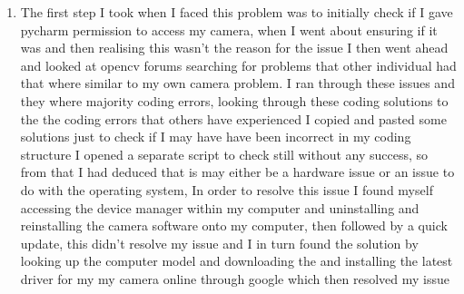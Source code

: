 \begin{enumerate}
 \item  The first step I took when I faced this problem was to initially check if I gave pycharm permission to access my camera, when I went about ensuring if it was and then realising this wasn't the reason for the issue I then went ahead and looked at opencv forums searching for problems that other individual had that where similar to my own camera problem. I ran through these issues and they where majority coding errors, looking through these coding solutions to the the coding errors that others have experienced I copied and pasted some solutions just to check if I may have have been incorrect in my coding structure I opened a separate script to check still without any success, so from that I had deduced that is may either be a hardware issue or an issue to do with the operating system, In order to resolve this issue I found myself accessing the device manager within my computer and uninstalling and reinstalling the camera software onto my computer, then followed by a quick update, this didn't resolve my issue and I in turn found the solution by looking up the computer model and downloading the and installing the latest driver for my my camera online through google which then resolved my issue 																										
 \end{enumerate}


